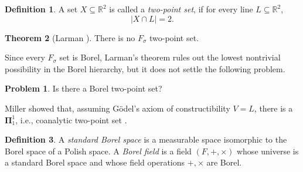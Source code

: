 \documentclass[11pt]{amsart}
\theoremstyle{definition}
\newtheorem{theorem}{Theorem}[section]
\newtheorem{problem}{Problem}[section]
\newtheorem{definition}[theorem]{Definition}
\begin{document}






\begin{definition}
A set $X\subseteq\mathbb R^2$ is called a \emph{two-point set}, if for every line
$L\subseteq\mathbb R^2$,
\[
|X\cap L|=2.
\]
\end{definition}

\begin{theorem}[Larman {\cite{Larman1968}}]
There is no $F_\sigma$ two-point set.
\end{theorem}

Since every $F_\sigma$ set is Borel, Larman's theorem rules out the lowest
nontrivial possibility in the Borel hierarchy, but it does not settle the following problem.

\begin{problem}
Is there a Borel two-point set?
\end{problem}

Miller showed that, assuming G\"odel's axiom of constructibility $V=L$, there is
a $\bm{\Pi}^1_1$, i.e., coanalytic two-point set \cite{Miller1989}.

\begin{definition}
A \emph{standard Borel space} is a measurable space isomorphic to the Borel space of a Polish space. A \emph{Borel field} is a field $(F, +, \times)$ whose universe is a standard Borel space and whose field operations $+,\times$ are Borel.
\end{definition}
\end{document}
